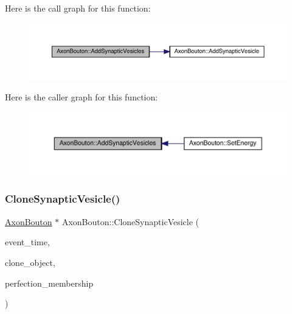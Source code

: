 Here is the call graph for this function\+:\nopagebreak
\begin{figure}[H]
\begin{center}
\leavevmode
\includegraphics[width=350pt]{class_axon_bouton_a0e264da88f6ca5d77aa42f415cb4f3aa_cgraph}
\end{center}
\end{figure}
Here is the caller graph for this function\+:\nopagebreak
\begin{figure}[H]
\begin{center}
\leavevmode
\includegraphics[width=350pt]{class_axon_bouton_a0e264da88f6ca5d77aa42f415cb4f3aa_icgraph}
\end{center}
\end{figure}
\mbox{\label{class_axon_bouton_a0e739b20447539f8db3655e83575fcf4}} 
\subsubsection{\texorpdfstring{Clone\+Synaptic\+Vesicle()}{CloneSynapticVesicle()}}
{\footnotesize\ttfamily \hyperlink{class_axon_bouton}{Axon\+Bouton} $\ast$ Axon\+Bouton\+::\+Clone\+Synaptic\+Vesicle (\begin{DoxyParamCaption}\item[{std\+::chrono\+::time\+\_\+point$<$ \hyperlink{universe_8h_a0ef8d951d1ca5ab3cfaf7ab4c7a6fd80}{Clock} $>$}]{event\+\_\+time,  }\item[{\hyperlink{class_axon_bouton}{Axon\+Bouton} $\ast$}]{clone\+\_\+object,  }\item[{double}]{perfection\+\_\+membership }\end{DoxyParamCaption})}



